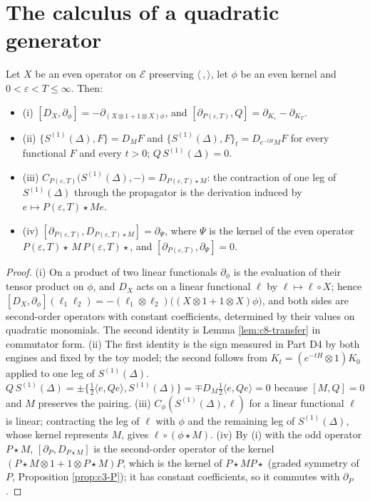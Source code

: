 \section{The calculus of a quadratic generator}

\begin{lemma}
\label{lem:d-calculus}
Let $X$ be an even operator on $\mathscr E$ preserving $\langle\,,\rangle$, let $\phi$ be an even kernel and $0<\varepsilon<T\le\infty$. Then:
\begin{itemize}
\item (i) $[D_X,\partial_\phi]=-\partial_{(X\otimes1+1\otimes X)\phi}$, and $[\partial_{P(\varepsilon,T)},Q]=\partial_{K_\varepsilon}-\partial_{K_T}$.
\item (ii) $\{S^{(1)}(\Delta),F\}=D_MF$ and $\{S^{(1)}(\Delta),F\}_t=D_{e^{-tH}M}F$ for every functional $F$ and every $t>0$; $Q\,S^{(1)}(\Delta)=0$.
\item (iii) $C_{P(\varepsilon,T)}\big(S^{(1)}(\Delta),-\big)=D_{P(\varepsilon,T)\star M}$: the contraction of one leg of $S^{(1)}(\Delta)$ through the propagator is the derivation induced by $e\mapsto P(\varepsilon,T)\star Me$.
\item (iv) $[\partial_{P(\varepsilon,T)},D_{P(\varepsilon,T)\star M}]=\partial_\Psi$, where $\Psi$ is the kernel of the even operator $P(\varepsilon,T)\star\,M\,P(\varepsilon,T)\star$, and $[\partial_{P(\varepsilon,T)},\partial_\Psi]=0$.
\end{itemize}
\end{lemma}

\begin{proof}
(i) On a product of two linear functionals $\partial_\phi$ is the evaluation of their tensor product on $\phi$, and $D_X$ acts on a linear functional $\ell$ by $\ell\mapsto\ell\circ X$; hence $[D_X,\partial_\phi](\ell_1\ell_2)=-(\ell_1\otimes\ell_2)\big((X\otimes1+1\otimes X)\phi\big)$, and both sides are second-order operators with constant coefficients, determined by their values on quadratic monomials. The second identity is Lemma \ref{lem:c8-transfer} in commutator form. (ii) The first identity is the sign measured in Part D4 by both engines and fixed by the toy model; the second follows from $K_t=(e^{-tH}\otimes1)K_0$ applied to one leg of $S^{(1)}(\Delta)$. $Q\,S^{(1)}(\Delta)=\pm\{\tfrac12\langle e,Qe\rangle,S^{(1)}(\Delta)\}=\mp D_M\tfrac12\langle e,Qe\rangle=0$ because $[M,Q]=0$ and $M$ preserves the pairing. (iii) $C_\phi(S^{(1)}(\Delta),\ell)$ for a linear functional $\ell$ is linear; contracting the leg of $\ell$ with $\phi$ and the remaining leg of $S^{(1)}(\Delta)$, whose kernel represents $M$, gives $\ell\circ(\phi\star M)$. (iv) By (i) with the odd operator $P\star M$, $[\partial_P,D_{P\star M}]$ is the second-order operator of the kernel $(P\star M\otimes1+1\otimes P\star M)P$, which is the kernel of $P\star MP\star$ (graded symmetry of $P$, Proposition \ref{prop:c3-P}); it has constant coefficients, so it commutes with $\partial_P$.
\end{proof}

